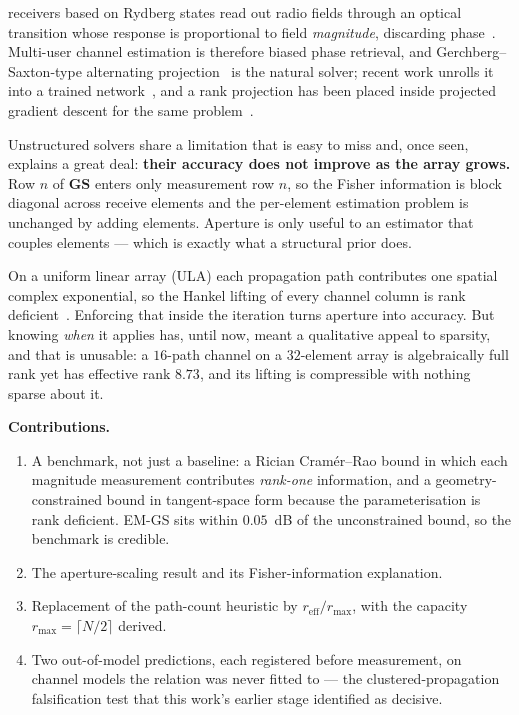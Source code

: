 \documentclass[journal]{IEEEtran}
\newcommand{\bG}{\mathbf{G}}
\newcommand{\bS}{\mathbf{S}}
\newcommand{\reff}{r_{\mathrm{eff}}}
\newcommand{\rmax}{r_{\max}}
\begin{document}
 receivers based on Rydberg states read out radio fields
through an optical transition whose response is proportional to field
\emph{magnitude}, discarding phase~\cite{cui2025,gong2025mag}. Multi-user
channel estimation is therefore biased phase retrieval, and
Gerchberg--Saxton-type alternating projection~\cite{gerchberg1972} is the
natural solver; recent work unrolls it into a trained
network~\cite{xiao2026}, and a rank projection has been placed inside
projected gradient descent for the same problem~\cite{xu2025}.

Unstructured solvers share a limitation that is easy to miss and, once seen,
explains a great deal: \textbf{their accuracy does not improve as the array
grows.}
Row $n$ of $\bG\bS$ enters only measurement row $n$, so the Fisher information
is block diagonal across receive elements and the per-element estimation
problem is unchanged by adding elements. Aperture is only useful to an
estimator that couples elements --- which is exactly what a structural prior
does.

On a uniform linear array (ULA) each propagation path contributes one spatial
complex exponential, so the Hankel lifting of every channel column is rank
deficient~\cite{cadzow1988,markovsky2008}. Enforcing that inside the iteration
turns aperture into accuracy. But knowing \emph{when} it applies has, until
now, meant a qualitative appeal to sparsity, and that is unusable: a $16$-path
channel on a $32$-element array is algebraically full rank yet has effective
rank $8.73$, and its lifting is compressible with nothing sparse about it.

\textbf{Contributions.}
\begin{enumerate}
\item A benchmark, not just a baseline: a Rician Cram\'er--Rao bound in which
each magnitude measurement contributes \emph{rank-one} information, and a
geometry-constrained bound in tangent-space form because the parameterisation
is rank deficient. EM-GS sits within $0.05$~dB of the unconstrained bound, so
the benchmark is credible.
\item The aperture-scaling result and its Fisher-information explanation.
\item Replacement of the path-count heuristic by $\reff/\rmax$, with the
capacity $\rmax=\lceil N/2\rceil$ derived.
\item Two out-of-model predictions, each registered before measurement, on
channel models the relation was never fitted to --- the clustered-propagation
falsification test that this work's earlier stage identified as decisive.
\end{enumerate}
\end{document}
